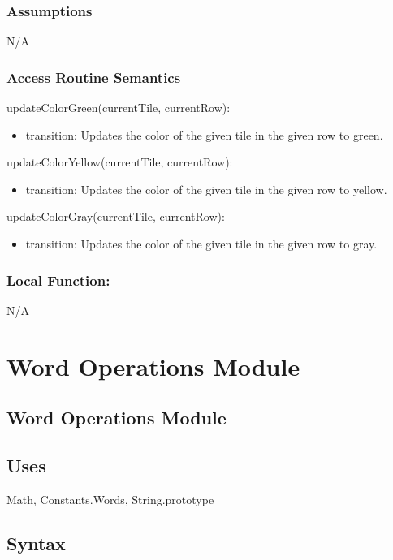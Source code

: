 \documentclass[12pt]{article}
\begin{document}
\subsubsection* {Assumptions}
N/A

\subsubsection* {Access Routine Semantics}

\noindent updateColorGreen(currentTile, currentRow):
\begin{itemize}
  \item transition: Updates the color of the given tile in the given row to green.
\end{itemize}

\noindent updateColorYellow(currentTile, currentRow):
\begin{itemize}
  \item transition: Updates the color of the given tile in the given row to yellow.
\end{itemize}

\noindent updateColorGray(currentTile, currentRow):
\begin{itemize}
  \item transition: Updates the color of the given tile in the given row to gray.
\end{itemize}
\subsubsection*{Local Function:}

N/A

\newpage 

\section {Word Operations Module}

\subsection* {Word Operations Module}

\subsection* {Uses}

Math, Constants.Words, String.prototype

\subsection* {Syntax}
\end{document}
